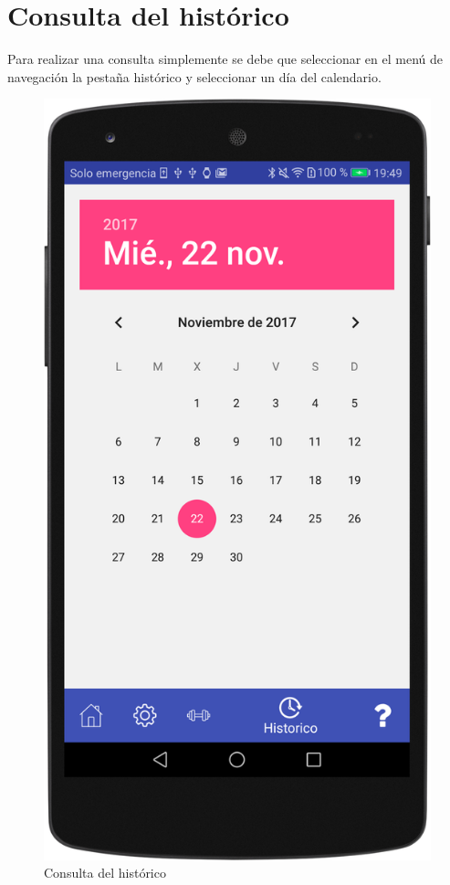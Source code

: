 \section{Consulta del histórico}

Para realizar una consulta simplemente se debe que seleccionar en el menú de navegación la pestaña histórico y seleccionar un día del calendario.

\begin{figure}[H]
	\centering
	\includegraphics[scale=0.10]{imagenes/histori.png}
	\caption{Consulta del histórico}
	\label{Consulta del histórico}
\end{figure}
